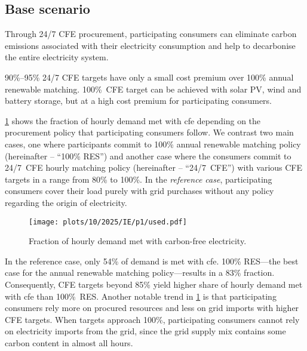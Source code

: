 \subsection{Base scenario}
\label{subsec:base}

\begin{res}
    Through 24/7 CFE procurement, participating consumers can eliminate carbon emissions associated with their electricity consumption and help to decarbonise the entire electricity system.
\end{res}

\begin{res}
    90\%--95\% 24/7 CFE targets have only a small cost premium over 100\% annual renewable matching. 100\%~CFE target can be achieved with solar PV, wind and battery storage, but at a high cost premium for participating consumers.
\end{res}

\cref{fig:10-2025-IE-p1-used} shows the fraction of hourly demand met with \gls{cfe} depending on the procurement policy that participating consumers follow.
We contrast two main cases, one where participants commit to 100\% annual renewable matching policy (hereinafter -- \enquote{100\% RES}) and another case where the consumers commit to 24/7~CFE hourly matching policy (hereinafter -- \enquote{24/7~CFE}) with various CFE targets in a range from 80\% to 100\%. 
In the \textit{reference case}, participating consumers cover their load purely with grid purchases without any policy regarding the origin of electricity.

\begin{figure}
    \centering
    \texttt{[image: plots/10/2025/IE/p1/used.pdf]}
    \caption{Fraction of hourly demand met with carbon-free electricity.}
    \label{fig:10-2025-IE-p1-used}
\end{figure}

In the reference case, only 54\% of demand is met with \gls{cfe}.
100\% RES---the best case for the annual renewable matching policy---results in a 83\% fraction.
Consequently, CFE targets beyond 85\% yield higher share of hourly demand met with \gls{cfe} than 100\%~RES.
Another notable trend in \cref{fig:10-2025-IE-p1-used} is that participating consumers rely more on procured resources and less on grid imports with higher CFE targets.
When targets approach 100\%, participating consumers cannot rely on electricity imports from the grid, since the grid supply mix contains some carbon content in almost all hours.

